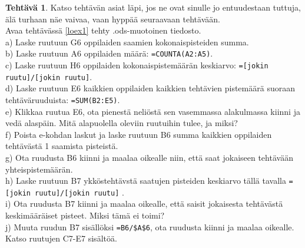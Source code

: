 \documentclass[12pt,leqno,a4paper,oneside]{amsart}
\theoremstyle{definition}
\newtheorem{exercise}{Tehtävä}
\theoremstyle{remark}
\numberwithin{equation}{section}
\begin{document}
\begin{exercise}
 Katso tehtävän asiat läpi, jos ne ovat sinulle jo entuudestaan tuttuja, älä turhaan näe vaivaa, vaan hyppää seuraavaan tehtävään.\\
 Avaa tehtävässä \ref{loex1} tehty .ods-muotoinen tiedosto.\\
 a) Laske ruutuun G6 oppilaiden saamien kokonaispisteiden summa.\\
 b) Laske ruutuun A6 oppilaiden määrä: \texttt{=COUNTA(A2:A5)}.\\
 c) Laske ruutuun H6 oppilaiden kokonaispistemäärän keskiarvo: \texttt{=[jokin ruutu]/[jokin ruutu]}.\\
 d) Laske ruutuun E6 kaikkien oppilaiden kaikkien tehtävien pistemäärä suoraan tehtäväruuduista: \texttt{=SUM(B2:E5)}.\\
 e) Klikkaa ruutua E6, ota pienestä neliöstä sen vasemmassa alakulmassa kiinni ja vedä alaspäin. Mitä alapuolella oleviin ruutuihin tulee,
 ja miksi? \\
 f) Poista e-kohdan laskut ja laske ruutuun B6 summa kaikkien oppilaiden tehtävästä 1 saamista pisteistä. \\
 g) Ota ruudusta B6 kiinni ja maalaa oikealle niin, että saat jokaiseen tehtävään yhteispistemäärän.\\
 h) Laske ruutuun B7 ykköstehtävstä saatujen pisteiden keskiarvo tällä tavalla \texttt{=[jokin ruutu]/[jokin ruutu]} .\\
 i) Ota ruudusta B7 kiinni ja maalaa oikealle, että saisit jokaisesta tehtävästä keskimääräiset pisteet. Miksi tämä ei toimi?\\
 j) Muuta ruudun B7 sisällöksi \texttt{=B6/\$A\$6}, ota ruudusta kiinni ja maalaa oikealle. Katso ruutujen C7-E7 sisältöä.
\end{exercise}
\end{document}
